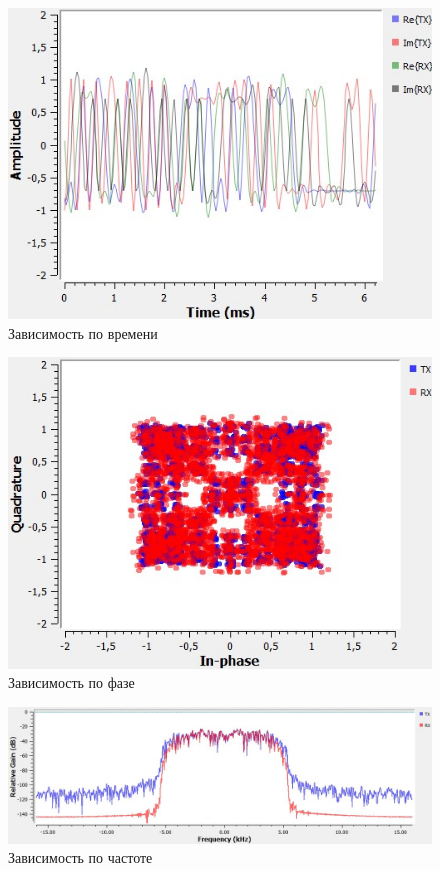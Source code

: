 \documentclass[a4paper, 12pt]{report}
\begin{document}
	\begin{figure}[H]
		\centering
		\includegraphics[width=1.0\textwidth]{4.jpg}
		\caption{Зависимость по времени}
		\label{fig:4}
	\end{figure}
	\begin{figure}[H]
		\centering
		\includegraphics[width=1.0\textwidth]{5.jpg}
		\caption{Зависимость по фазе}
		\label{fig:5}
	\end{figure}
	\begin{figure}[H]
		\centering
		\includegraphics[width=1.0\textwidth]{6.jpg}
		\caption{Зависимость по частоте}
		\label{fig:6}
	\end{figure}
\end{document}
